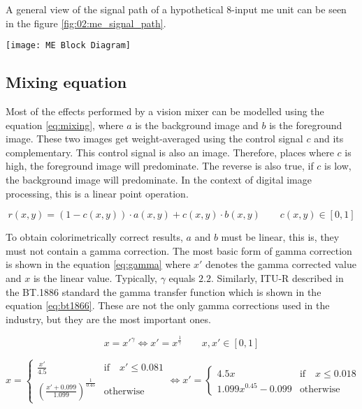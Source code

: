 \documentclass[../main.tex]{subfiles}
\begin{document}
A general view of the signal path of a hypothetical 8-input \gls{me} unit can be seen in the figure \ref{fig:02:me_signal_path}.\newline

\begin{sidewaysfigure}[htbp]
    \centering
    \texttt{[image: ME Block Diagram]}

    \caption{Signal path of a hypothetical ME with 8 inputs, 4 USKs and 2 DSKs}
    \label{fig:02:me_signal_path}
\end{sidewaysfigure}

\subsection{Mixing equation}
Most of the effects performed by a vision mixer can be modelled using the equation \eqref{eq:mixing}, where $a$ is the background image and $b$ is the foreground image. These two images get weight-averaged using the control signal $c$ and its complementary. This control signal is also an image. Therefore, places where $c$ is high, the foreground image will predominate. The reverse is also true, if $c$ is low, the background image will predominate. In the context of digital image processing, this is a linear point operation.

\begin{equation} \label{eq:mixing}
    r(x, y) = (1 - c(x, y))  \cdot a(x, y) + c(x, y) \cdot b(x, y) \qquad c(x, y) \in [0, 1]
\end{equation}

To obtain colorimetrically correct results, $a$ and $b$ must be linear, this is, they must not contain a gamma correction. The most basic form of gamma correction is shown in the equation \eqref{eq:gamma} where $x'$ denotes the gamma corrected value and $x$ is the linear value. Typically, $\gamma$ equals $2.2$. Similarly, ITU-R described in the BT.1886 standard\cite{bt1886} the gamma transfer function which is shown in the equation \eqref{eq:bt1866}. These are not the only gamma corrections used in the industry, but they are the most important ones.\newline

\begin{equation} \label{eq:gamma}
    x = x'^{\gamma} \Longleftrightarrow x' = x^{\frac{1}{\gamma}} \qquad x, x' \in [0, 1]
\end{equation}

\begin{equation} \label{eq:bt1866}
    x =
    \begin{cases}
        \frac{x'}{4.5} &\text{if} \quad x' \le 0.081 \\
        (\frac{x' + 0.099}{1.099})^{\frac{1}{0.45}} &\text{otherwise}
    \end{cases}
    \Longleftrightarrow
    x' =
    \begin{cases}
        4.5x &\text{if}\quad x \le 0.018 \\
        1.099x^{0.45} - 0.099 &\text{otherwise}
    \end{cases}
\end{equation}
\end{document}
